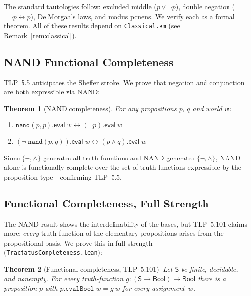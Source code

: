 \documentclass[10pt, letterpaper]{article}
\newtheorem{theorem}{Theorem}[section]
\theoremstyle{definition}
\theoremstyle{remark}
\newcommand{\Sach}{\mathsf{S}}
\newcommand{\eval}{\mathsf{eval}}
\begin{document}
\noindent
The standard tautologies follow: excluded middle ($p \lor
\lnot p$), double negation ($\lnot\lnot p \leftrightarrow p$),
De Morgan's laws, and modus ponens.  We verify each as a formal
theorem.  All of these results depend on \texttt{Classical.em}
(see Remark~\ref{rem:classical}).

\subsection{NAND Functional Completeness}
\label{sec:nand}

TLP~5.5 anticipates the Sheffer stroke.  We prove that negation
and conjunction are both expressible via NAND:

\begin{theorem}[NAND completeness]
\label{thm:nand}
For any propositions $p$, $q$ and world $w$:
\begin{enumerate}[nosep]
  \item $\mathtt{nand}(p, p).\eval\;w \leftrightarrow
    (\lnot p).\eval\;w$
  \item $(\lnot\;\mathtt{nand}(p, q)).\eval\;w \leftrightarrow
    (p \land q).\eval\;w$
\end{enumerate}
\end{theorem}

\noindent
Since $\{\lnot, \land\}$ generates all truth-functions and NAND
generates $\{\lnot, \land\}$, NAND alone is functionally
complete over the set of truth-functions expressible by the
proposition type---confirming TLP~5.5.

\subsection{Functional Completeness, Full Strength}
\label{sec:fullcompleteness}

The NAND result shows the interdefinability of the bases, but
TLP~5.101 claims more: \emph{every} truth-function of the
elementary propositions arises from the propositional basis.  We
prove this in full strength (\texttt{TractatusCompleteness.lean}):

\begin{theorem}[Functional completeness, TLP~5.101]
\label{thm:fc}
Let $\Sach$ be finite, decidable, and nonempty.  For every
truth-function $g : (\Sach \to \mathsf{Bool}) \to \mathsf{Bool}$
there is a proposition $p$ with
$p.\mathtt{evalBool}\;w = g\;w$ for every assignment~$w$.
\end{theorem}
\end{document}
